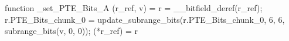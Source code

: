 function _set_PTE_Bits_A (r_ref, v) = {
    r = __bitfield_deref(r_ref);
    r.PTE_Bits_chunk_0 = update_subrange_bits(r.PTE_Bits_chunk_0, 6, 6, subrange_bits(v, 0, 0));
    (*r_ref) = r
}
